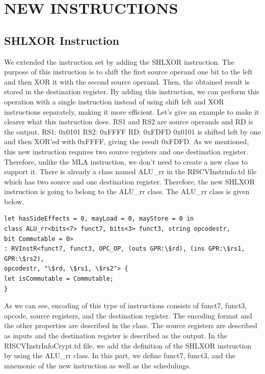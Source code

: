 \clearpage
\chapter{NEW INSTRUCTIONS}\label{Ch9}

\section{SHLXOR Instruction}
We extended the instruction set by adding the SHLXOR instruction. The purpose of this instruction is to shift the first source operand one bit to the left and then XOR it with the second source operand. Then, the obtained result is stored in the destination register. By adding this instruction, we can perform this operation with a single instruction instead of using shift left and XOR instructions separately, making it more efficient.
Let’s give an example to make it clearer what this instruction does. RS1 and RS2 are source operands and RD is the output.
RS1: 0x0101     RS2: 0xFFFF     RD: 0xFDFD
0x0101 is shifted left by one and then XOR’ed with 0xFFFF, giving the result 0xFDFD.
As we mentioned, this new instruction requires two source registers and one destination register. Therefore, unlike the MLA instruction, we don’t need to create a new class to support it. There is already a class named ALU\_rr in the RISCVInstrinfo.td file which has two source and one destination register. Therefore, the new SHLXOR instruction is going to belong to the ALU\_rr class. The ALU\_rr class is given below.

\begin{lstlisting}
let hasSideEffects = 0, mayLoad = 0, mayStore = 0 in
class ALU_rr<bits<7> funct7, bits<3> funct3, string opcodestr,
bit Commutable = 0>
: RVInstR<funct7, funct3, OPC_OP, (outs GPR:\$rd), (ins GPR:\$rs1, GPR:\$rs2),
opcodestr, "\$rd, \$rs1, \$rs2"> {
let isCommutable = Commutable;
}
\end{lstlisting}

As we can see, encoding of this type of instructions consists of funct7, funct3, opcode, source registers, and the destination register. The encoding format and the other properties are described in the class. The source registers are described as inputs and the destination register is described as the output.
In the RISCVInstrInfoCrypt.td file, we add the definition of the SHLXOR instruction by using the ALU\_rr class. In this part, we define funct7, funct3, and the mnemonic of the new instruction as well as the schedulings.

